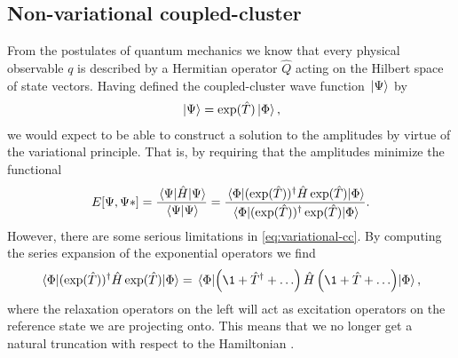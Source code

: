         \subsection{Non-variational coupled-cluster}
            \label{subsec:non-variational-coupled-cluster}
            From the postulates of quantum mechanics we know that every physical
            observable $q$ is described by a Hermitian operator $\hat{Q}$ acting
            on the Hilbert space of state vectors.
            Having defined the coupled-cluster wave function $\ket*{\Psi}$ by
            \begin{align}
                \ket*{\Psi} = \exponential(\clust)\ket*{\slat},
            \end{align}
            we would expect to be able to construct a solution to the amplitudes
            by virtue of the variational principle.
            That is, by requiring that the amplitudes minimize the functional
            \begin{align}
                \energy[\Psi, \Psi*]
                = \frac{
                    \mel*{\Psi}{\hamil}{\Psi}
                }{
                    \braket*{\Psi}{\Psi}
                }
                = \frac{
                    \mel*{\slat}{
                        (\exponential(\clust))^{\dagger}
                        \hamil
                        \exponential(\clust)
                    }{\slat}
                }{
                    \mel*{\slat}{
                       (\exponential(\clust))^{\dagger}
                       \exponential(\clust)
                   }{\slat}
                }.
                \label{eq:variational-cc}
            \end{align}
            However, there are some serious limitations in
            \autoref{eq:variational-cc}.
            By computing the series expansion of the exponential operators we
            find
            \begin{align}
                \mel*{\slat}{
                   (\exponential(\clust))^{\dagger}
                   \hamil
                   \exponential(\clust)
               }{\slat}
                = \mel*{\slat}{
                    \para{
                        \1 + \clust^{\dagger} + \dots
                    }
                    \hamil
                    \para{
                        \1 + \clust + \dots
                    }
                }{\slat},
                \label{eq:expansion-variational-cc}
            \end{align}
            where the relaxation operators on the left will act as excitation
            operators on the reference state we are projecting onto.
            This means that we no longer get a natural truncation with respect
            to the Hamiltonian \cite{crawford2000introduction}.

